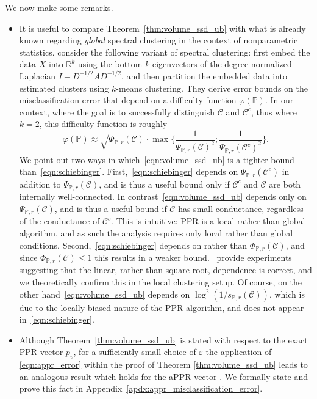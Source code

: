 \documentclass[11pt,twoside]{article}
\newcommand{\Reals}{\mathbb{R}}
\newcommand{\1}{\mathbf{1}}
\newcommand{\mc}[1]{\mathcal{#1}}
\newcommand{\Pbb}{\mathbb{P}}
\newcommand{\wh}[1]{\widehat{#1}}
\begin{document}
We now make some remarks.
\begin{itemize}
	\item It is useful to compare Theorem~\ref{thm:volume_ssd_ub} with what is already known regarding \emph{global} spectral clustering in the context of nonparametric statistics. \cite{schiebinger2015} consider the following variant of spectral clustering: first embed the data $X$ into $\Reals^k$ using the bottom $k$ eigenvectors of the degree-normalized Laplacian $I - D^{-1/2}AD^{-1/2}$, and then partition the embedded data into estimated clusters \smash{$\wh{C}_1,\ldots,\wh{C}_k$} using $k$-means clustering. They derive error bounds on the misclassification error that depend on a difficulty function $\varphi(\Pbb)$. In our context, where the goal is to successfully distinguish $\mc{C}$ and $\mc{C}^c$, thus where $k = 2$, this difficulty function is roughly
	\begin{equation}
	\label{eqn:schiebinger}
	\varphi(\Pbb) \approx \sqrt{\Phi_{\Pbb,r}(\mc{C})} \cdot \max\biggl\{ \frac{1}{\Psi_{\Pbb,r}(\mc{C})^2}; \frac{1}{\Psi_{\Pbb,r}(\mc{C}^c)^2}\biggr\}.
	\end{equation}
	We point out two ways in which~\eqref{eqn:volume_ssd_ub} is a tighter bound than~\eqref{eqn:schiebinger}. First,~\eqref{eqn:schiebinger} depends on $\Psi_{\Pbb,r}(\mc{C}^c)$ in addition to $\Psi_{\Pbb,r}(\mc{C})$, and is thus a useful bound only if $\mc{C}^c$ and $\mc{C}$ are both internally well-connected. In contrast~\eqref{eqn:volume_ssd_ub} depends only on $\Psi_{\Pbb,r}(\mc{C})$, and is thus a useful bound if $\mc{C}$ has small conductance, regardless of the conductance of $\mc{C}^c$. This is intuitive: PPR is a local rather than global algorithm, and as such the analysis requires only local rather than global conditions. Second,~\eqref{eqn:schiebinger} depends on \smash{$\sqrt{\Phi_{\Pbb,r}(\mc{C})}$} rather than $\Phi_{\Pbb,r}(\mc{C})$, and since $\Phi_{\Pbb,r}(\mc{C}) \leq 1$ this results in a weaker bound.~\citet{schiebinger2015} provide experiments suggesting that the linear, rather than square-root, dependence is correct, and we theoretically confirm this in the local clustering setup. Of course, on the other hand~\eqref{eqn:volume_ssd_ub} depends on $\log^2(1/s_{\Pbb,r}(\mc{C}))$, which is due to the locally-biased nature of the PPR algorithm, and does not appear in~\eqref{eqn:schiebinger}.
	
	\item Although Theorem~\ref{thm:volume_ssd_ub} is stated with respect to the exact PPR vector $p_v$, for a sufficiently small choice of $\varepsilon$ the 
	application of \eqref{eqn:appr_error} within the proof of Theorem
	\ref{thm:volume_ssd_ub} leads to an analogous result which holds for the aPPR vector . We formally state and prove this fact in Appendix~\ref{apdx:appr_misclassification_error}.
\end{itemize}
\end{document}
